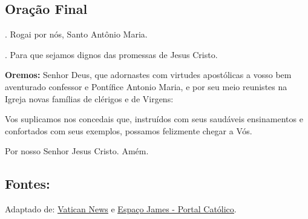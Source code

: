 \documentclass[a4paper,14pt]{extarticle} \usepackage[utf8]{inputenc}
\makeatletter
\newcommand{\vers@resp@sym}{%
  \raisebox{0.2ex}{\rotatebox[origin=c]{-20}{$\m@th\rceil$}}%
}
\newcommand{\vers@resp}[2]{%
  {\ooalign{%
     \hidewidth\kern#1\vers@resp@sym\hidewidth\cr
     #2\cr
  }}%
}
\DeclareRobustCommand{\versicle}{\vers@resp{-0.1em}{V}}
\DeclareRobustCommand{\response}{\vers@resp{0pt}{R}}
\makeatother
\begin{document}
\subsection{Oração Final} \label{oracao-final}
\versicle. \quad Rogai por nós, Santo Antônio Maria.

\response. \quad Para que sejamos dignos das promessas de Jesus Cristo.

\textbf{Oremos:} Senhor Deus, que adornastes com virtudes apostólicas a vosso bem aventurado confessor e Pontífice Antonio Maria, e por seu meio reunistes na Igreja novas famílias de clérigos e de Virgens:

Vos suplicamos nos concedais que, instruídos com seus saudáveis ensinamentos e confortados com seus exemplos, possamos felizmente chegar a Vós.

Por nosso Senhor Jesus Cristo. Amém. 

\vfill

\begin{center}
\subsection*{Fontes:}
Adaptado de: \underline{\href{https://www.vaticannews.va/pt/santo-do-dia/10/24/s--antonio-maria-claret--bispo--fundador-da-congregacao-dos-miss.html}{Vatican News}} e \underline{\href{https://www.espacojames.com.br/?cat=54&id=1418}{Espaço James - Portal Católico}}.
\end{center}
\end{document}
